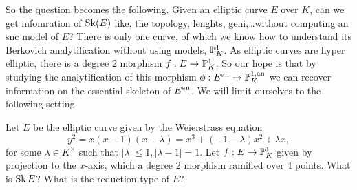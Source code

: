 So the question becomes the following. Given an elliptic curve $E$ over $K$, can we get infomration of $\operatorname{Sk}(E)$ like, the topology, lenghts, geni,\ldots without computing an snc model of  $E$?
There is only one curve, of which we know how to understand its Berkovich analytification without using models, $\mathbb{P}^{1}_K$.
As elliptic curves are hyper elliptic, there is a degree $2$ morphism $f: E \to \mathbb{P}^{1}_K$. 
So our hope is that by studying the analytification of this morphism $\phi: E{}^{\text{an}} \to \mathbb{P}^{1, \text{an}}_K$ we can recover information on the essential skeleton of $E{}^{\text{an}}$. 
We will limit ourselves to the following setting.
\begin{problem}\label{prob:main_problem}
	Let $E$ be the elliptic curve given by the Weierstrass equation 
	\begin{equation}\label{eq:weierstrass_problem}
		y^2 = x(x-1)(x-\lambda) = x^3 + (-1 - \lambda) x^2 + \lambda x
	,\end{equation}
	for some $\lambda \in K^\times $ such that $|\lambda| \le 1, |\lambda - 1| = 1$. 
	Let $f: E \to \mathbb{P}^{1}_K$ given by projection to the $x$-axis, which a degree 2 morphism ramified over $4$ points. 
	What is $\operatorname{Sk} E$? What is the reduction type of $E$?
\end{problem}
\setlength{\LTcapwidth}{5.7in}
